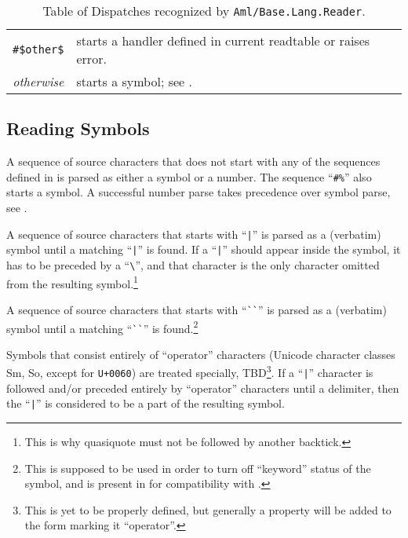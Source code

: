 \begin{table}
\begin{longtable}{ r l }
  \lstinline!#$other$! & starts a handler defined in current readtable or raises error. \\
  
  {\em otherwise} & starts a symbol; see \nameref{subsec:aml-base-lang-reader-symbols}. \\
\end{longtable}
\caption{\label{tab:aml-base-lang-reader-dispatch}Table of Dispatches recognized by \lstinline!Aml/Base.Lang.Reader!.}
\end{table}





\newpage

\subsection{Reading Symbols}
\label{subsec:aml-base-lang-reader-symbols}


A sequence of source characters that does not start with any of the sequences defined in  is parsed as either a symbol or a number. The sequence ``\lstinline!#%!'' also starts a symbol. A successful number parse takes precedence over symbol parse, see . 

A sequence of source characters that starts with ``\lstinline!|!'' is parsed as a (verbatim) symbol until a matching ``\lstinline!|!'' is found. If a ``\lstinline!|!'' should appear inside the symbol, it has to be preceded by a ``\lstinline!\!'', and that character is the only character omitted from the resulting symbol.\footnote{This is why quasiquote must not be followed by another backtick.}

A sequence of source characters that starts with ``\lstinline!``!'' is parsed as a (verbatim) symbol until a matching ``\lstinline!``!'' is found.\footnote{This is supposed to be used in order to turn off ``keyword'' status of the symbol, and is present in \AmlBase for compatibility with \Aml.}

Symbols that consist entirely of ``operator'' characters (Unicode character classes Sm, So, except for \lstinline!U+0060!) are treated specially, TBD\footnote{This is yet to be properly defined, but generally a property will be added to the form marking it ``operator''.}. If a ``\lstinline!|!'' character is followed and/or preceded entirely by ``operator'' characters until a delimiter, then the ``\lstinline!|!'' is considered to be a part of the resulting symbol.

